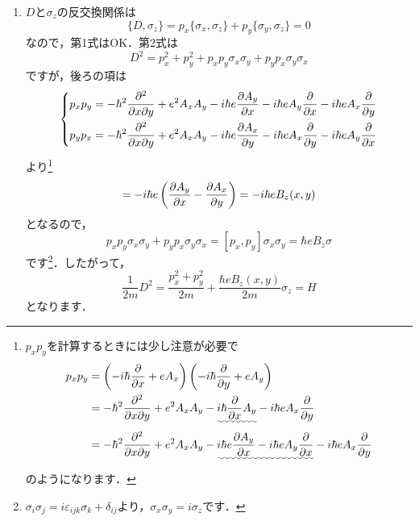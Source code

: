 \documentclass[a4paper,pdflatex,ja=standard]{bxjsarticle}
\begin{document}
\begin{enumerate}
  \item 
  $D$と$\sigma_z$の反交換関係は
  \begin{equation}
    \{
      D,\sigma_z
    \}
    =
    p_x
    \{
      \sigma_x,\sigma_z
    \}
    +
    p_y
    \{
      \sigma_y,\sigma_z
    \}
    =
    0
  \end{equation}
  なので，第1式はOK．第2式は
  \begin{equation}
    D^2
    =
    p_x^2+p_y^2
    +
    p_xp_y\sigma_x\sigma_y
    +
    p_yp_x\sigma_y\sigma_x
  \end{equation}
  ですが，後ろの項は
  \begin{equation}
    \left\{
      \begin{alignedat}{1}
        p_xp_y
        &=
        -
        \hbar^2\pdv[2]{}{x}{y}
        +
        e^2A_xA_y
        -
        i\hbar e\pdv{A_y}{x}
        -
        i\hbar eA_y\pdv{}{x}
        -
        i\hbar eA_x\pdv{}{y}
        \\
        p_yp_x
        &=
        -
        \hbar^2\pdv[2]{}{x}{y}
        +
        e^2A_xA_y
        -
        i\hbar e\pdv{A_x}{y}
        -
        i\hbar eA_x\pdv{}{y}
        -
        i\hbar eA_y\pdv{}{x}
      \end{alignedat}
    \right.
  \end{equation}
  より\footnote{
    $p_xp_y$を計算するときには少し注意が必要で
    \begin{align*}
      p_xp_y
      &=
      \left(  
        -
        i\hbar\pdv{}{x}
        +
        eA_x
      \right)
      \left( 
        -
        i\hbar\pdv{}{y}
        +
        eA_y
      \right)
      \\
      &=
      -
      \hbar^2\pdv[2]{}{x}{y}
      +
      e^2A_xA_y
      -
      \uwave{
        i\hbar\pdv{}{x}
        A_y
      }
      -
      i\hbar eA_x\pdv{}{y}      
      \\
      &=
      -
      \hbar^2\pdv[2]{}{x}{y}
      +
      e^2A_xA_y
      -
      \uwave{
        i\hbar e\pdv{A_y}{x}
        -
        i\hbar eA_y\pdv{}{x}
      }
      -
      i\hbar eA_x\pdv{}{y}
    \end{align*}
    のようになります．
  }
  \begin{equation}
    [p_x,p_y]
    =
    -i\hbar e\left( \pdv{A_y}{x}-\pdv{A_x}{y} \right)
    =
    -i\hbar e B_z(x,y)
  \end{equation}
  となるので，
  \begin{equation}
    p_xp_y\sigma_x\sigma_y
    +
    p_yp_x\sigma_y\sigma_x
    =
    [p_x,p_y]
    \sigma_x\sigma_y
    =
    \hbar eB_z \sigma
  \end{equation}
  です\footnote{
    $\sigma_i\sigma_j=i\varepsilon_{ijk}\sigma_k+\delta_{ij}$より，$\sigma_x\sigma_y=i\sigma_z$です．
  }．したがって，
  \begin{equation}
    \frac{1}{2m}D^2
    =
    \frac{p_x^2+p_y^2}{2m}
    +
    \frac{\hbar e B_z(x,y)}{2m}\sigma_z
    =
    H
  \end{equation}
  となります．


\end{enumerate}
\end{document}
